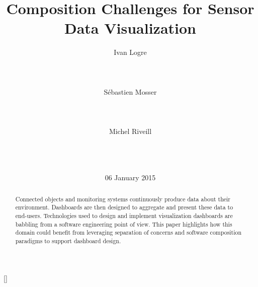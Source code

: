 \documentclass{acm_proc_article-sp}
\begin{document}
\title{Composition Challenges for Sensor Data Visualization}

 \author{
  \alignauthor Ivan Logre\\
  \\
  \\
  \\
  \alignauthor S{\'e}bastien Mosser\\
  \\
  \\
  \\
  \alignauthor Michel Riveill\\
  \\
  \\
  \\
   }

\date{06 January 2015}

\maketitle
\begin{abstract}
  Connected objects and monitoring systems continuously produce
  data about their environment. Dashboards are then designed to
  aggregate and present these data to end-users.
  Technologies used to design and implement visualization dashboards
  are babbling from a software engineering point of view. This paper
  highlights how this domain could benefit from leveraging separation
  of concerns and software composition paradigms to support dashboard design.
\end{abstract}

[]

\end{document}
